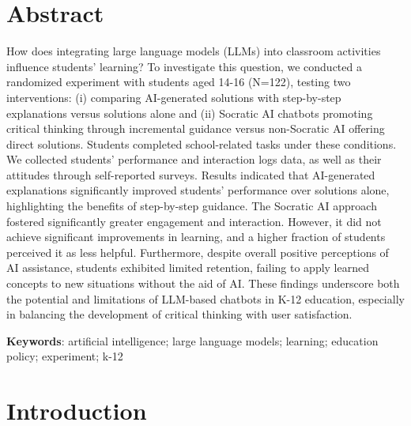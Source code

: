 \documentclass[
  12pt,
]{article}
\begin{document}
\section*{Abstract}\label{abstract}

How does integrating large language models (LLMs) into classroom activities influence students' learning? To investigate this question, we conducted a randomized experiment with students aged 14-16 (N=122), testing two interventions: (i) comparing AI-generated solutions with step-by-step explanations versus solutions alone and (ii) Socratic AI chatbots promoting critical thinking through incremental guidance versus non-Socratic AI offering direct solutions. Students completed school-related tasks under these conditions. We collected students' performance and interaction logs data, as well as their attitudes through self-reported surveys. Results indicated that AI-generated explanations significantly improved students' performance over solutions alone, highlighting the benefits of step-by-step guidance. The Socratic AI approach fostered significantly greater engagement and interaction. However, it did not achieve significant improvements in learning, and a higher fraction of students perceived it as less helpful. Furthermore, despite overall positive perceptions of AI assistance, students exhibited limited retention, failing to apply learned concepts to new situations without the aid of AI. These findings underscore both the potential and limitations of LLM-based chatbots in K-12 education, especially in balancing the development of critical thinking with user satisfaction.

\textbf{Keywords}: artificial intelligence; large language models; learning; education policy; experiment; k-12

\section{Introduction}\label{introduction}
\end{document}
